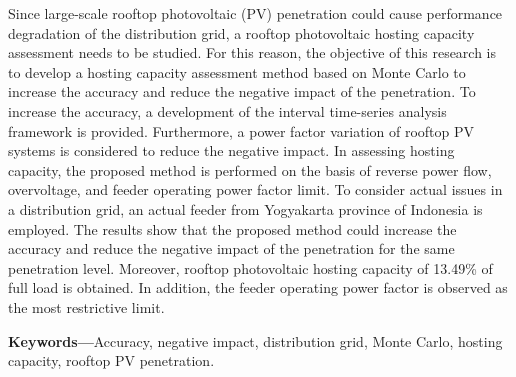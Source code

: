 Since large-scale rooftop photovoltaic (PV) penetration could cause performance degradation of the distribution grid, a rooftop photovoltaic hosting capacity assessment needs to be studied. For this reason, the objective of this research is to develop a hosting capacity assessment method based on Monte Carlo to increase the accuracy and reduce the negative impact of the penetration. To increase the accuracy, a development of the interval time-series analysis framework is provided. Furthermore, a power factor variation of rooftop PV systems is considered to reduce the negative impact. In assessing hosting capacity, the proposed method is performed on the basis of reverse power flow, overvoltage, and feeder operating power factor limit. To consider actual issues in a distribution grid, an actual feeder from Yogyakarta province of Indonesia is employed. The results show that the proposed method could increase the accuracy and reduce the negative impact of the penetration for the same penetration level. Moreover, rooftop photovoltaic hosting capacity of 13.49\% of full load is obtained. In addition, the feeder operating power factor is observed as the most restrictive limit.

\noindent\textbf{Keywords---}Accuracy, negative impact, distribution grid, Monte Carlo, hosting capacity, rooftop PV penetration.